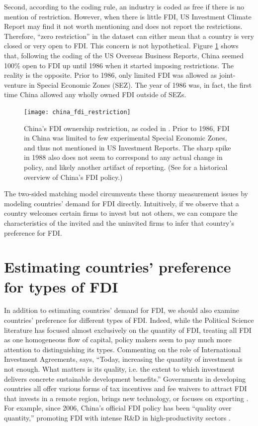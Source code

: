 Second, according to the coding rule, an industry is coded as free if there is
no mention of restriction. However, when there is little FDI, US Investment
Climate Report may find it not worth mentioning and does not report the
restrictions. Therefore, ``zero restriction'' in the dataset can either mean
that a country is very closed or very open to FDI. This concern is not
hypothetical. Figure \ref{fig:china_fdi_restriction} shows that, following the
coding of the US Overseas Business Reports, China seemed 100\% open to FDI up
until 1986 when it started imposing restrictions. The reality is the opposite.
Prior to 1986, only limited FDI was allowed as joint-venture in Special Economic
Zones (SEZ). The year of 1986 was, in fact, the first time China allowed any
wholly owned FDI outside of SEZs.

\begin{figure}[tbp] \centering
  \texttt{[image: china\_fdi\_restriction]}
  \caption[China's FDI ownership restriction.]{China's FDI ownership
    restriction, as coded in \citet{Pandya2010}. Prior to 1986, FDI in China was
    limited to few experimental Special Economic Zones, and thus not mentioned
    in US Investment Reports. The sharp spike in 1988 also does not seem to
    correspond to any actual change in policy, and likely another artifact of
    reporting. (See \citet{Zebregs2002} for a historical overview of China's FDI
    policy.)}
  \label{fig:china_fdi_restriction}
\end{figure}

The two-sided matching model circumvents these thorny measurement issues by
modeling countries' demand for FDI directly. Intuitively, if we observe that a
country welcomes certain firms to invest but not others, we can compare the
characteristics of the invited and the uninvited firms to infer that country's
preference for FDI.

\section{Estimating countries' preference for types of FDI}

In addition to estimating countries' demand for FDI, we should also examine
countries' preference for different types of FDI. Indeed, while the Political
Science literature has focused almost exclusively on the quantity of FDI,
treating all FDI as one homogeneous flow of capital, policy makers seem to pay
much more attention to distinguishing its types. Commenting on the role of
International Investment Agreements, \citet{UNCTAD2015} says, ``Today,
increasing the quantity of investment is not enough. What matters is its
quality, i.e. the extent to which investment delivers concrete sustainable
development benefits.'' Governments in developing countries all offer various
forms of tax incentives and fee waivers to attract FDI that invests in a remote
region, brings new technology, or focuses on exporting \citep{Ricupero2000}. For
example, since 2006, China's official FDI policy has been ``quality over
quantity,'' promoting FDI with intense R\&D in high-productivity sectors
\citep{Guangzhou2011}.

